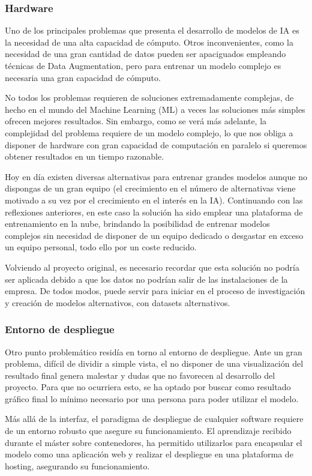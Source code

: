 \subsubsection{Hardware}
Uno de los principales problemas que presenta el desarrollo de modelos de IA es la necesidad de una alta capacidad de cómputo.
Otros inconvenientes, como la necesidad de una gran cantidad de datos pueden ser apaciguados empleando técnicas de Data Augmentation, pero para entrenar un modelo complejo es necesaria una gran capacidad de cómputo.

No todos los problemas requieren de soluciones extremadamente complejas, de hecho en el mundo del Machine Learning (ML) a veces las soluciones más simples ofrecen mejores resultados.
Sin embargo, como se verá más adelante, la complejidad del problema requiere de un modelo complejo, lo que nos obliga a disponer de hardware con gran capacidad de computación en paralelo si queremos obtener resultados en un tiempo razonable.

Hoy en día existen diversas alternativas para entrenar grandes modelos aunque no dispongas de un gran equipo (el crecimiento en el número de alternativas viene motivado a su vez por el crecimiento en el interés en la IA).
Continuando con las reflexiones anteriores, en este caso la solución ha sido emplear una plataforma de entrenamiento en la nube, brindando la posibilidad de entrenar modelos complejos sin necesidad de disponer de un equipo dedicado o desgastar en exceso un equipo personal, todo ello por un coste reducido.

Volviendo al proyecto original, es necesario recordar que esta solución no podría ser aplicada debido a que los datos no podrían salir de las instalaciones de la empresa.
De todos modos, puede servir para iniciar en el proceso de investigación y creación de modelos alternativos, con datasets alternativos.

\subsubsection{Entorno de despliegue}
Otro punto problemático residía en torno al entorno de despliegue.
Ante un gran problema, difícil de dividir a simple vista, el no disponer de una visualización del resultado final genera malestar y dudas que no favorecen al desarrollo del proyecto.
Para que no ocurriera esto, se ha optado por buscar como resultado gráfico final lo mínimo necesario por una persona para poder utilizar el modelo.

Más allá de la interfaz, el paradigma de despliegue de cualquier software requiere de un entorno robusto que asegure su funcionamiento.
El aprendizaje recibido durante el máster sobre contenedores, ha permitido utilizarlos para encapsular el modelo como una aplicación web y realizar el despliegue en una plataforma de hosting, asegurando su funcionamiento.

